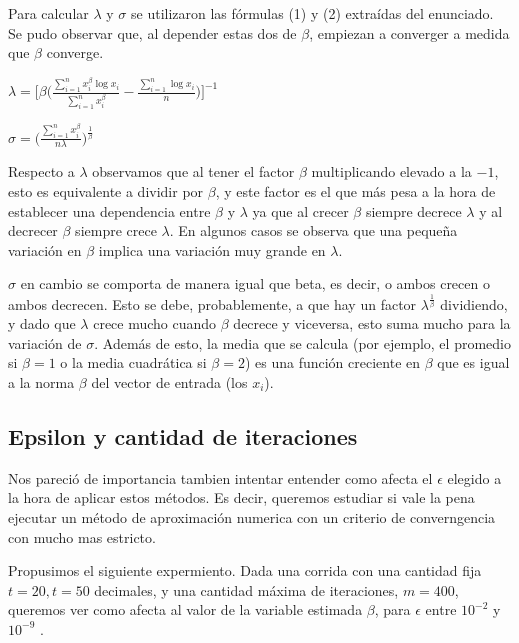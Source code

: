 \indent Para calcular $\lambda$ y $\sigma$ se utilizaron las f\'ormulas 
(1) y (2) extra\'idas del enunciado. Se pudo observar que, al depender estas 
dos de $\beta$, empiezan a converger a medida que $\beta$ converge.
\begin{center}
$\lambda = \big[ \beta \big( \frac{\sum_{i=1}^{n}x_i^\beta \log x_i}{ \sum_{i=1}^{n} x_i^\beta} 
- \frac{\sum_{i=1}^{n} \log x_i}{n} \big)\big]^{-1}$

$\sigma = \big( \frac{\sum_{i=1}^{n} x_i^\beta}{n\lambda}\big)^{\frac{1}{\beta}}$
\end{center}

Respecto a $\lambda$ observamos que al tener el factor $\beta$ multiplicando 
elevado a la $-1$, esto es equivalente a dividir por $\beta$, y este factor es el 
que m\'as pesa a la hora de establecer una dependencia entre $\beta$ y $\lambda$ 
ya que al crecer $\beta$ siempre decrece $\lambda$ y al decrecer $\beta$ siempre
crece $\lambda$. En algunos casos se observa que una peque\~na variaci\'on en 
$\beta$ implica una variaci\'on muy grande en $\lambda$.

$\sigma$ en cambio se comporta de manera igual que beta, es decir, o ambos 
crecen o ambos decrecen. Esto se debe, probablemente, a que hay un factor 
$\lambda^{\frac{1}{\beta}}$ dividiendo, y dado que $\lambda$ crece mucho cuando 
$\beta$ decrece y viceversa, esto suma mucho para la variaci\'on de $\sigma$. 
Adem\'as de esto, la media que se calcula (por ejemplo, el promedio si $\beta = 
1$ o la media cuadr\'atica si $\beta = 2$) es una funci\'on creciente en 
$\beta$ que es igual a la norma $\beta$ del vector de entrada (los $x_i$).


\subsection{Epsilon y cantidad de iteraciones}

\indent Nos pareci\'o de importancia tambien intentar entender como afecta
el $\epsilon$ elegido a la hora de aplicar estos m\'etodos. Es decir,
queremos estudiar si vale la pena ejecutar un m\'etodo de aproximaci\'on numerica
con un criterio de converngencia con mucho mas estricto.

Propusimos el siguiente expermiento. Dada una corrida con una cantidad fija $t=20, t=50$ decimales,
y una cantidad m\'axima de iteraciones, $m=400$, queremos ver como afecta al valor
de la variable estimada $\beta$, para $\epsilon$ entre $10^{-2}$ y $10^{-9}$ .

